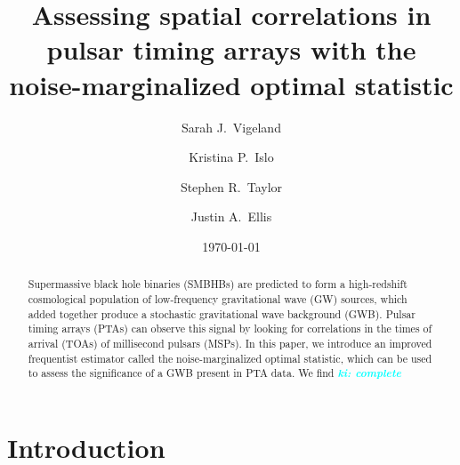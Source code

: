 \documentclass[twocolumn,aps,prd,superscriptaddress]{revtex4-1}
\newcommand{\ki}[1]{\textcolor{cyan}{\it{\textbf{ki: #1}}} }
\begin{document}
\title{Assessing spatial correlations in pulsar timing arrays with the noise-marginalized optimal statistic}


\author{Sarah J.\ Vigeland}

\author{Kristina P.\ Islo}

\author{Stephen R.\ Taylor}

\author{Justin A.\ Ellis}

\date{\today}  

\begin{abstract}
Supermassive black hole binaries (SMBHBs) are predicted to form a 
high-redshift cosmological population of low-frequency gravitational wave (GW) sources, 
which added together produce a stochastic gravitational wave background (GWB). 
Pulsar timing arrays (PTAs) can observe this signal by looking for correlations in the 
times of arrival (TOAs) of millisecond pulsars (MSPs). 
In this paper, we introduce an improved frequentist estimator called the noise-marginalized optimal statistic, 
which can be used to assess the significance of a GWB present in PTA data. 
We find \ki{complete}

\end{abstract}

\maketitle


\section{Introduction}
\end{document}
